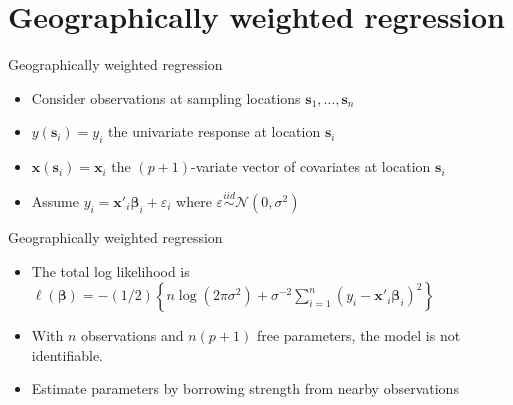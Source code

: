 \documentclass[12pt,t]{beamer}
\newcommand{\subt}[1]{{\footnotesize \color{subtitle} {#1}}}
\begin{document}
\section{Geographically weighted regression}



\begin{frame}{Geographically weighted regression}
\subt{\citep{Brundson:1998a, Fotheringham:2002}}

\bigskip
\begin{itemize}
  \item Consider observations at sampling locations $\bm{s}_1, \dots, \bm{s}_n$
  \item $y(\bm{s}_i) = y_i$ the univariate response at location $\bm{s}_i$
  \item $\bm{x}(\bm{s}_i) = \bm{x}_i$ the $(p+1)$-variate vector of covariates at location $\bm{s}_i$
  \item Assume $y_i = \bm{x}'_i \bm{\beta}_i + \varepsilon_i$ where $\varepsilon \overset{iid}{\sim} \mathcal{N} \left( 0,\sigma^2 \right)$
\end{itemize} 

\end{frame}





\begin{frame}{Geographically weighted regression}
\subt{\citep{Brundson:1998a, Fotheringham:2002}}

\bigskip
\begin{itemize}
  \item The total log likelihood is $\ell\left( \bm{\beta} \right) = - \left(1/2\right) \left\{ n \log \left( 2 \pi \sigma^2\right) +  \sigma^{-2}  \sum_{i=1}^n \left(y_i - \bm{x}'_i\bm{\beta}_i \right)^2  \right\}$
  \item With $n$ observations and $n(p+1)$ free parameters, the model is not identifiable.
  \item Estimate parameters by borrowing strength from nearby observations
\end{itemize} 

\end{frame}
\end{document}
